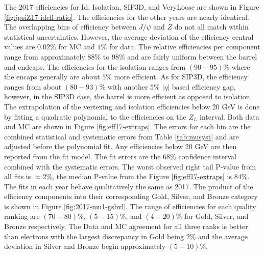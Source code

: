  The 2017 efficiencies for Id, Isolation, SIP3D, and VeryLoose are shown in Figure \ref{fig:jpsiZ17-ideff-ratio}. The efficiencies for the other years are nearly identical. The overlapping bins of efficiency between $J/\psi$ and $Z$ do not all match within statistical uncertainties. However, the average deviation of the efficiency central values are $0.02\%$ for MC and $1\%$ for data.  The relative efficiencies per component range from approximately $88\%$ to $98\%$ and are fairly uniform between the barrel and endcaps. The efficiencies for the isolation ranges from $(90 - 95)\%$ where the encaps generally are about $5\%$ more efficient. As for SIP3D, the efficiency ranges from about $(80 - 93)\%$ with another $5\%$ $|\eta|$ based efficiency gap, however, in the SIP3D case, the barrel is more efficient as opposed to isolation.  The extrapolation of the vertexing and isolation efficiencies below 20 GeV is done by fitting a quadratic polynomial to the efficiencies on the $Z_L$ interval.  Both data and MC are shown in Figure \ref{fig:eff17-extraps}.  The errors for each bin are the combined statistical and systematic errors from Table \ref{tab:musyst} and are adjusted before the polynomial fit. Any efficiencies below 20 GeV are then reported from the fit model. The fit errors are the 68\% confidence interval combined with the systematic errors. The worst observed right tail P-value from all fits is $\approx 2\%$, the median P-value from the Figure \ref{fig:eff17-extraps} is $84\%$. The fits in each year behave qualitatively the same as 2017.
The product of the efficiency components into their corresponding Gold, Silver, and Bronze category is shown in Figure \ref{fig:2017-mu1-gsbvl}. The range of efficiencies for each quality ranking are $(70 - 80)\%$, $(5 - 15)\%$, and $(4 - 20)\%$ for Gold, Silver, and Bronze respectively. The Data and MC agreement for all three ranks is better than electrons with the largest discrepancy in Gold being $2\%$ and the average deviation in Silver and Bronze begin approximately $(5-10)\%$.




